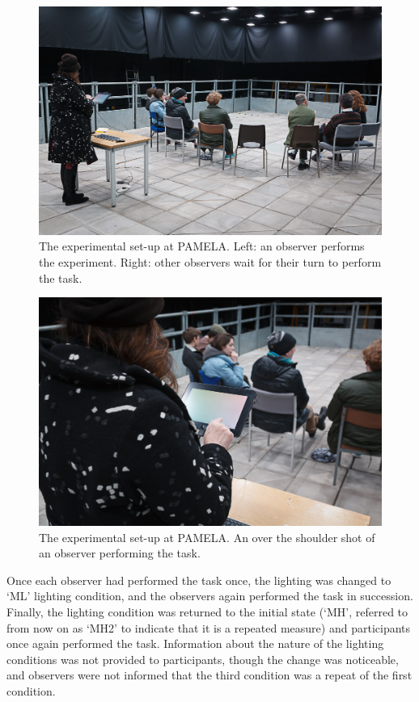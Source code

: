 \begin{figure}[hbtp]
\includegraphics[width=\textwidth]{figs/tablet/PAMELAobs1.jpg} 
\caption{The experimental set-up at \acrshort{PAMELA}. Left: an observer performs the experiment. Right: other observers wait for their turn to perform the task.}
\label{fig:PAMELAobs1}
\end{figure}

\begin{figure}[hbtp]
\includegraphics[width=\textwidth]{figs/tablet/PAMELAobs2.jpg} 
\caption{The experimental set-up at \gls{PAMELA}. An over the shoulder shot of an observer performing the task.}
\label{fig:PAMELAobs2}
\end{figure}

Once each observer had performed the task once, the lighting was changed to `ML' lighting condition, and the observers again performed the task in succession. Finally, the lighting condition was returned to the initial state (`MH', referred to from now on as `MH2' to indicate that it is a repeated measure) and participants once again performed the task. Information about the nature of the lighting conditions was not provided to participants, though the change was noticeable, and observers were not informed that the third condition was a repeat of the first condition. 

